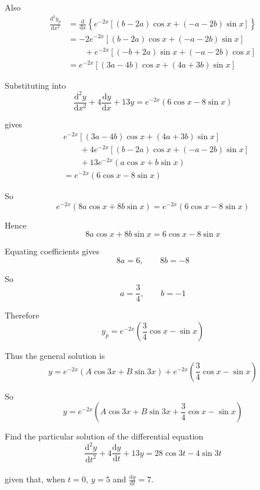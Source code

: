 \documentclass[leqno]{article}
\begin{document}
\begin{enumerate}[
  label=\textbf{\arabic*.},
  leftmargin=*,
  topsep=0pt,
  partopsep=0pt,
  parsep=0pt
]
\begin{djsSolution}
\begin{enumerate}[label=\textbf{(\alph*)}]
Also
\begin{align*}
\frac{\mathrm{d}^2y_p}{\mathrm{d}x^2}
&= \frac{\mathrm{d}}{\mathrm{d}x}\left\{e^{-2x}\left[(b-2a)\cos x+(-a-2b)\sin x\right]\right\} \\
&= -2e^{-2x}\left[(b-2a)\cos x+(-a-2b)\sin x\right] \\
&\qquad +e^{-2x}\left[(-b+2a)\sin x+(-a-2b)\cos x\right] \\
&= e^{-2x}\left[(3a-4b)\cos x+(4a+3b)\sin x\right]
\end{align*}

Substituting into
\[
\frac{\mathrm{d}^2 y}{\mathrm{d}x^2}+4\frac{\mathrm{d}y}{\mathrm{d}x}+13y=e^{-2x}(6\cos x-8\sin x)
\]

gives
\begin{align*}
& e^{-2x}\left[(3a-4b)\cos x+(4a+3b)\sin x\right] \\
& \qquad +4e^{-2x}\left[(b-2a)\cos x+(-a-2b)\sin x\right] \\
& \qquad +13e^{-2x}\left(a\cos x+b\sin x\right) \\
&= e^{-2x}(6\cos x-8\sin x)
\end{align*}

So
\[
e^{-2x}\left(8a\cos x+8b\sin x\right)=e^{-2x}(6\cos x-8\sin x)
\]

Hence
\[
8a\cos x+8b\sin x=6\cos x-8\sin x
\]

Equating coefficients gives
\[
8a=6, \qquad 8b=-8
\]

So
\[
a=\frac{3}{4}, \qquad b=-1
\]

Therefore
\[
y_p=e^{-2x}\left(\frac{3}{4}\cos x-\sin x\right)
\]

Thus the general solution is
\[
y=e^{-2x}\left(A\cos 3x+B\sin 3x\right)+e^{-2x}\left(\frac{3}{4}\cos x-\sin x\right)
\]

So
\[
y=e^{-2x}\left(A\cos 3x+B\sin 3x+\frac{3}{4}\cos x-\sin x\right)
\]
\end{enumerate}
\end{djsSolution}


\newpage

\questionitem

Find the particular solution of the differential equation\\

\[
\frac{\mathrm{d}^2 y}{\mathrm{d}t^2}+4\frac{\mathrm{d}y}{\mathrm{d}t}+13y=28\cos 3t-4\sin 3t
\]\\
given that, when $t=0$, $y=5$ and $\frac{\mathrm{d}y}{\mathrm{d}t}=7$.  \\


\end{enumerate}
\end{document}
